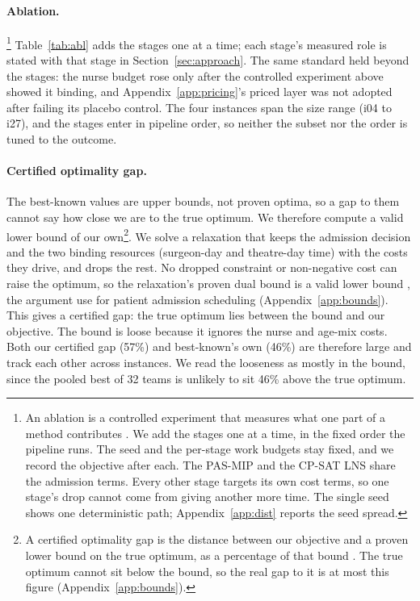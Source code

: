 \documentclass[11pt]{article}
\newcommand{\anote}[1]{\footnote{#1}}
\begin{document}
	\paragraph{Ablation.}\anote{An ablation is a controlled experiment that measures what one part of a method contributes \citep{fawcett2016}. We add the stages one at a time, in the fixed order the pipeline runs. The seed and the per-stage work budgets stay fixed, and we record the objective after each. The PAS-MIP and the CP-SAT LNS share the admission terms. Every other stage targets its own cost terms, so one stage's drop cannot come from giving another more time. The single seed shows one deterministic path; Appendix~\ref{app:dist} reports the seed spread.} Table~\ref{tab:abl} adds the stages one at a time; each stage's measured role is stated with that stage in Section~\ref{sec:approach}. The same standard held beyond the stages: the nurse budget rose only
	after the controlled experiment above showed it binding, and Appendix~\ref{app:pricing}'s priced
	layer was not adopted after failing its placebo control. The four instances span the size range (i04 to i27), and the stages enter in pipeline order, so neither the subset nor the order is tuned to the outcome.
	
	
	
	\paragraph{Certified optimality gap.} The best-known values are upper bounds, not proven optima, so
	a gap to them cannot say how close we are to the true optimum. We therefore compute a valid lower
	bound of our own\anote{A certified optimality gap is the distance between our objective and a proven lower bound on the true optimum, as a percentage of that bound \citep{wolsey1998}. The true optimum cannot sit below the bound, so the real gap to it is at most this figure (Appendix~\ref{app:bounds}).}. We solve a relaxation that keeps the admission decision and the two binding
	resources (surgeon-day and theatre-day time) with the costs they drive, and drops the rest.
	No dropped constraint or non-negative cost can raise the optimum, so the relaxation's proven dual bound is a valid lower bound \citep{wolsey1998}, the argument \citet{ceschia2011}
	use for patient admission scheduling (Appendix~\ref{app:bounds}). This gives a certified gap:
	the true optimum lies between the bound and our objective. The bound is
	loose because it ignores the nurse and age-mix costs. Both our certified gap (57\%) and
	best-known's own (46\%) are therefore large and track each other across instances. We read
	the looseness as mostly in the bound, since the pooled best of 32 teams is unlikely to sit 46\% above the true optimum.
	
\end{document}
